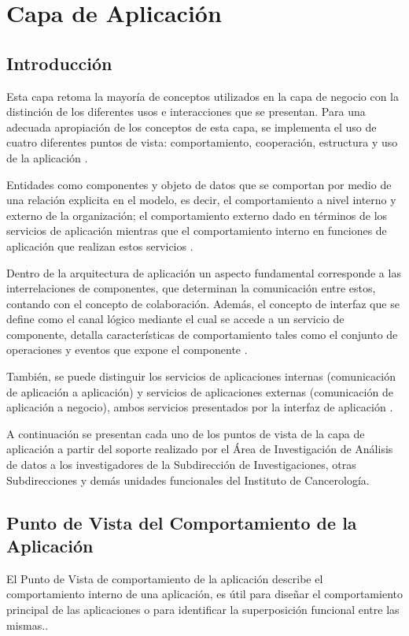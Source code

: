 \chapter{Capa de Aplicación}
\section{Introducción}
Esta capa retoma la mayoría de conceptos  utilizados en la capa de negocio con la distinción de los diferentes usos e interacciones que se presentan. Para una adecuada apropiación de los conceptos de esta capa, se implementa el uso de cuatro diferentes puntos  de vista: comportamiento, cooperación, estructura y uso de la aplicación \cite{BolanosCastro2019}.

Entidades como componentes y objeto de datos que se comportan por medio de una relación explicita en el modelo, es decir, el comportamiento a nivel interno y externo de la organización; el comportamiento externo dado en términos de los servicios de aplicación mientras que el comportamiento interno en funciones de aplicación que realizan estos servicios \cite{BolanosCastro2019}.

Dentro de la arquitectura de aplicación un aspecto fundamental corresponde a las interrelaciones de componentes, que determinan la comunicación entre estos, contando con el concepto de colaboración. Además, el concepto de interfaz que se define como el canal lógico mediante el cual se accede a un servicio de componente, detalla características de comportamiento tales como el conjunto de operaciones y eventos que expone el componente \cite{BolanosCastro2019}.

También, se puede distinguir los servicios de aplicaciones internas (comunicación de aplicación a aplicación) y servicios de aplicaciones externas (comunicación de aplicación a negocio), ambos servicios presentados por la interfaz de aplicación \cite{BolanosCastro2019}.

A continuación se presentan cada uno de los puntos de vista de la capa de aplicación a partir del soporte realizado por el Área de Investigación de Análisis de datos a los investigadores de la Subdirección de Investigaciones, otras Subdirecciones y demás unidades funcionales del Instituto de Cancerología.

\newpage
\section{Punto de Vista del Comportamiento de la Aplicación}
El Punto de Vista de comportamiento de la aplicación describe el comportamiento interno de una aplicación, es útil para diseñar el comportamiento principal de las aplicaciones o para identificar la superposición funcional entre las mismas.\cite{BolanosCastro2019}.

